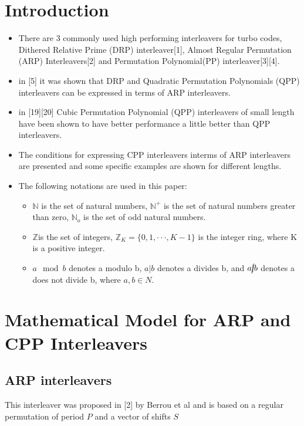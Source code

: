 \documentclass[fontsize=12pt]{article}
\begin{document}
\section{Introduction}
\begin{itemize}
\item There are 3 commonly used high performing interleavers for turbo codes, Dithered Relative Prime (DRP) interleaver[1], Almost Regular Permutation (ARP) Interleavers[2] and Permutation Polynomial(PP) interleaver[3][4].

\item in [5] it was shown that DRP and Quadratic Permutation Polynomials (QPP) interleavers can be expressed in terms of ARP interleavers.

\item in [19][20] Cubic Permutation Polynomial (QPP) interleavers of small length have been shown to have better performance a little better than QPP interleavers.

\item The conditions for expressing CPP interleavers interms of ARP interleavers are presented and some specific examples are shown for different lengths.

\item The following notations are used in this paper:
\begin{itemize}
\item $\mathbb{N}$ is the set
of natural numbers, $\mathbb{N}^+$ is the set of natural numbers greater
than zero, $\mathbb{N}_o$ is the set of odd natural numbers.

\item $\mathbb{Z}$is the set
of integers, $\mathbb{Z}_K = \{0, 1, \cdot\cdot\cdot , K -1\}$ is the integer ring, where
K is a positive integer.

\item $a\mod b$ denotes a modulo b, $a | b$
denotes a divides b, and $a \cancel{|} b$ denotes a does not divide b,
where $a, b \in N$.
\end{itemize}
\end{itemize}

 
 \section{Mathematical Model for ARP and CPP Interleavers}
 \subsection{ARP interleavers}
 This interleaver was proposed in [2] by Berrou et al and is based on a regular permutation of period $P$ and a vector of shifts $S$
 
\end{document}
